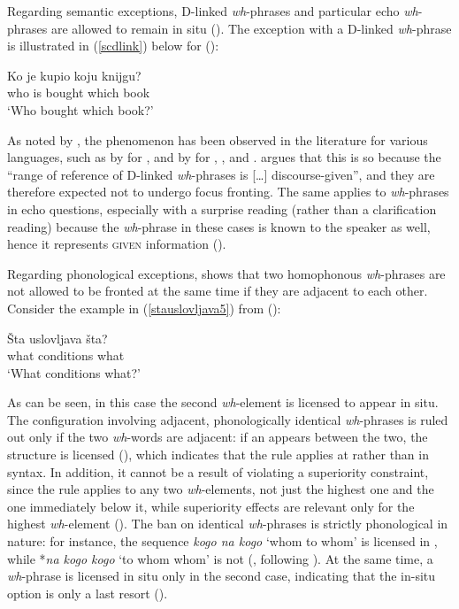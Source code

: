 Regarding semantic exceptions, D-linked \textit{wh}-phrases and particular echo \textit{wh}-phrases are allowed to remain in situ (\citealt[359--364]{boskovic2012}). The exception with a D-linked \textit{wh}-phrase is illustrated in (\ref{scdlink}) below for  (\citealt[360, ex. 26a]{boskovic2012}):

\ea \gll Ko je kupio koju knijgu? \label{scdlink}\\
who is bought which book\\
\glt `Who bought which book?'
\z

As noted by \citet[359]{boskovic2012}, the phenomenon has been observed in the literature for various languages, such as by \citet{wachowicz1974} for , and by \citet{pesetsky1987, pesetsky1989} for , ,  and . \citet[360]{boskovic2012} argues that this is so because the ``range of reference of D-linked \textit{wh}-phrases is [\ldots] discourse-given'', and they are therefore expected not to undergo focus fronting. The same applies to \textit{wh}-phrases in echo questions, especially with a surprise reading (rather than a clarification reading) because the \textit{wh}-phrase in these cases is known to the speaker as well, hence it represents \textsc{given} information (\citealt[362--364]{boskovic2012}).

Regarding phonological exceptions, \citet[364--376]{boskovic2012} shows that two homophonous \textit{wh}-phrases are not allowed to be fronted at the same time if they are adjacent to each other. Consider the example in (\ref{stauslovljava5}) from  (\citealt[364, ex. 37]{boskovic2012}):

\ea \gll \v{S}ta uslovljava \v{s}ta? \label{stauslovljava5}\\
what conditions what\\
\glt `What conditions what?'
\z

As can be seen, in this case the second \textit{wh}-element is licensed to appear in situ. The configuration involving adjacent, phonologically identical \textit{wh}-phrases is ruled out only if the two \textit{wh}-words are adjacent: if an  appears between the two, the structure is licensed (\citealt[364]{boskovic2012}), which indicates that the rule applies at  rather than in syntax. In addition, it cannot be a result of violating a superiority constraint, since the rule applies to any two \textit{wh}-elements, not just the highest one and the one immediately below it, while superiority effects are relevant only for the highest \textit{wh}-element (\citealt[365--367]{boskovic2012}). The ban on identical \textit{wh}-phrases is strictly phonological in nature: for instance, the sequence \textit{kogo na kogo} `whom to whom' is licensed in , while *\textit{na kogo kogo} `to whom whom' is not (\citealt[365--367]{boskovic2002}, following \citealt{billingsrudin1996}). At the same time, a \textit{wh}-phrase is licensed in situ only in the second case, indicating that the in-situ option is only a last resort (\citealt[367]{boskovic2002}).

